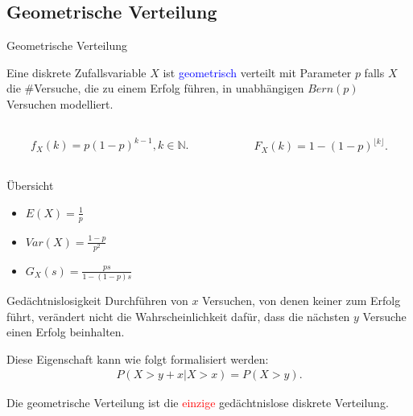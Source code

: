\documentclass{beamer}
\def\padding{\vspace{0.5cm}}
\def\b{\textcolor{blue}}
\def\r{\textcolor{red}}
\begin{document}
\subsection{Geometrische Verteilung}
\begin{frame}{Geometrische Verteilung}
    \begin{definition}
        Eine diskrete Zufallsvariable $X$ ist \b{geometrisch} verteilt mit Parameter $p$ falls $X$ die \#Versuche, die zu einem Erfolg führen, in unabhängigen $Bern(p)$ Versuchen modelliert.
    \end{definition}\pause
    \begin{columns}
        \begin{column}{0.5\textwidth}
           \begin{align*}
                f_X(k) = p (1 - p)^{k - 1}, k \in \mathbb{N}.
            \end{align*}
        \end{column}\pause
        \begin{column}{0.5\textwidth}
            \begin{align*}
                F_X(k) = 1 - (1 - p)^{\lfloor k \rfloor}.
            \end{align*}
        \end{column}
    \end{columns}\pause\par\padding
    \begin{exampleblock}{Übersicht}
        \begin{itemize}
            \item $E(X) = \frac{1}{p}$\pause
            \item $Var(X) = \frac{1 - p}{p^2}$\pause
            \item $G_X(s) = \frac{p s}{1 - (1 - p) s}$
        \end{itemize}
    \end{exampleblock}
\end{frame}

\begin{frame}
    \begin{block}{Gedächtnislosigkeit}
        Durchführen von $x$ Versuchen, von denen keiner zum Erfolg führt, verändert nicht die Wahrscheinlichkeit dafür, dass die nächsten $y$ Versuche einen Erfolg beinhalten.\pause\par\padding
        Diese Eigenschaft kann wie folgt formalisiert werden:
        \begin{align*}
            P(X > y + x | X > x) = P(X > y).
        \end{align*}\pause\par\padding
        Die geometrische Verteilung ist die \r{einzige} gedächtnislose diskrete Verteilung.
    \end{block}
\end{frame}
\end{document}
